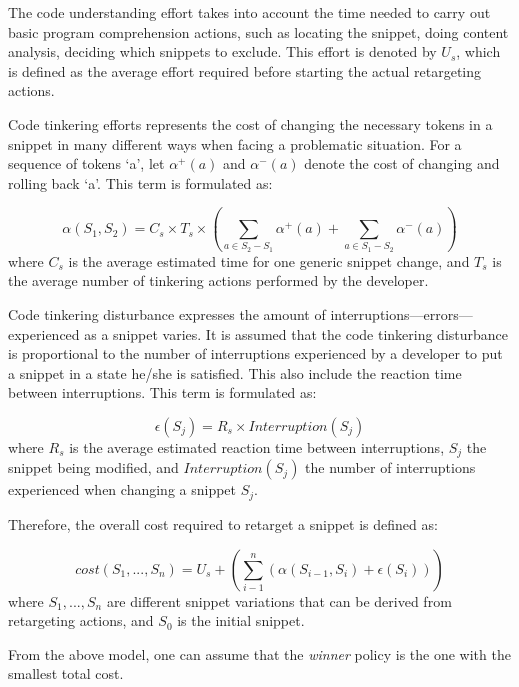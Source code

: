 The code understanding effort takes into account the time needed to carry out basic program comprehension actions, such as locating the snippet, doing content analysis, deciding which snippets to exclude. This effort is denoted by $U_{s}$, which is defined as the average effort required before starting the actual retargeting actions.

Code tinkering efforts represents the cost of changing the necessary tokens in a snippet in many different ways when facing a problematic situation. For a sequence of tokens `a', let $\alpha^{+}(a)$ and $\alpha^{-}(a)$ denote the cost of changing and rolling back `a'. This term is formulated as: 

\begin{equation}
	\alpha(S_{1}, S_{2}) = C_{s} \times T_s \times (\sum_{a \in S_2 - S_1}\alpha^{+}(a) + \sum_{a \in S_1 - S_2}\alpha^{-}(a))
	\label{costmodification}
\end{equation} where $C_{s}$ is the average estimated time for one generic snippet change, and $T_s$ is the average number of tinkering actions performed by the developer.

Code tinkering disturbance expresses the amount of interruptions---errors---experienced as a snippet varies. It is assumed that the code tinkering disturbance is proportional to the number of interruptions experienced by a developer to put a snippet in a state he/she is satisfied. This also include the reaction time between interruptions. This term is formulated as:

\begin{equation}
	\epsilon(S_{j}) = R_{s} \times Interruption(S_j)
	\label{costmodification}
\end{equation} where $R_{s}$ is the average estimated reaction time between interruptions, $S_j$ the snippet being modified, and $Interruption(S_j)$ the number of interruptions experienced when changing a snippet $S_j$. 

Therefore, the overall cost required to retarget a snippet is defined as:

\begin{equation}
	cost(S_1, ..., S_n) = U_s + (\sum_{i-1}^{n}(\alpha(S_{i-1}, S_{i}) + \epsilon(S_{i})))
	\label{totalWork}
\end{equation} where $S_1, ..., S_n$ are different snippet variations that can be derived from retargeting actions, and $S_0$ is the initial snippet.   

From the above model, one can assume that the \emph{winner} policy is the one with the smallest total cost.

